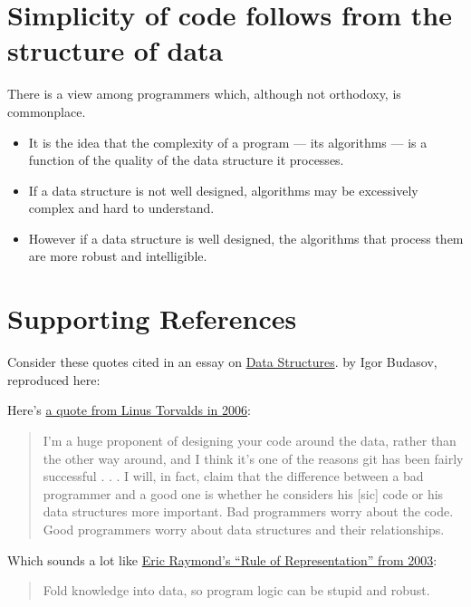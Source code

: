 \documentclass[
  letterpaper,
  DIV=11,
  numbers=noendperiod]{scrreport}
\providecommand{\tightlist}{%
  \setlength{\itemsep}{0pt}\setlength{\parskip}{0pt}}\usepackage{longtable,booktabs,array}
\begin{document}
\hypertarget{simplicity-of-code-follows-from-the-structure-of-data}{%
\section{Simplicity of code follows from the structure of
data}\label{simplicity-of-code-follows-from-the-structure-of-data}}

There is a view among programmers which, although not orthodoxy, is
commonplace.

\begin{itemize}
\tightlist
\item
  It is the idea that the complexity of a program --- its algorithms ---
  is a function of the quality of the data structure it processes.
\item
  If a data structure is not well designed, algorithms may be
  excessively complex and hard to understand.
\item
  However if a data structure is well designed, the algorithms that
  process them are more robust and intelligible.
\end{itemize}

\hypertarget{supporting-references}{%
\section{Supporting References}\label{supporting-references}}

Consider these quotes cited in an essay on
\href{https://medium.com/webdevops/data-structures-548cbea9c520}{Data
Structures}. by Igor Budasov, reproduced here:

Here's \href{https://lwn.net/Articles/193245/}{a quote from Linus
Torvalds in 2006}:

\begin{quote}
I'm a huge proponent of designing your code around the data, rather than
the other way around, and I think it's one of the reasons git has been
fairly successful . . . I will, in fact, claim that the difference
between a bad programmer and a good one is whether he considers his
{[}sic{]} code or his data structures more important. Bad programmers
worry about the code. Good programmers worry about data structures and
their relationships.
\end{quote}

Which sounds a lot like
\href{http://www.catb.org/~esr/writings/taoup/html/ch01s06.html}{Eric
Raymond's ``Rule of Representation'' from 2003}:

\begin{quote}
Fold knowledge into data, so program logic can be stupid and robust.
\end{quote}
\end{document}
